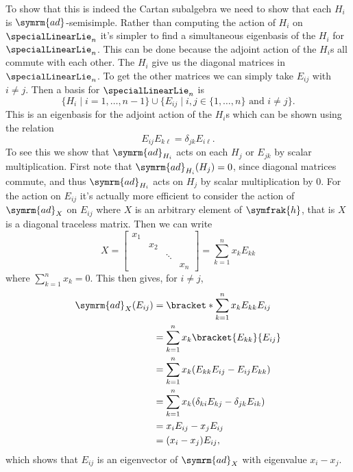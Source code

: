 \documentclass[fleqn]{NotesClass}
\newcommand{\ad}{\symrm{ad}}
\newcommand{\csa}{\symfrak{h}}
\begin{document}
    To show that this is indeed the Cartan subalgebra we need to show that each \(H_i\) is \(\ad\)-semisimple.
    Rather than computing the action of \(H_i\) on \(\specialLinearLie_n\) it's simpler to find a simultaneous eigenbasis of the \(H_i\) for \(\specialLinearLie_n\).
    This can be done because the adjoint action of the \(H_i\)s all commute with each other.
    The \(H_i\) give us the diagonal matrices in \(\specialLinearLie_n\).
    To get the other matrices we can simply take \(E_{ij}\) with \(i \ne j\).
    Then a basis for \(\specialLinearLie_n\) is
    \begin{equation}
        \{H_i \mid i = 1, \dotsc, n - 1\} \cup \{E_{ij} \mid i, j \in \{1, \dotsc, n\} \text{ and } i \ne j\}.
    \end{equation}
    This is an eigenbasis for the adjoint action of the \(H_i\)s which can be shown using the relation
    \begin{equation}
        E_{ij}E_{k\ell} = \delta_{jk}E_{i\ell}.
    \end{equation}
    To see this we show that \(\ad_{H_i}\) acts on each \(H_j\) or \(E_{jk}\) by scalar multiplication.
    First note that \(\ad_{H_i}(H_j) = 0\), since diagonal matrices commute, and thus \(\ad_{H_i}\) acts on \(H_j\) by scalar multiplication by \(0\).
    For the action on \(E_{ij}\) it's actually more efficient to consider the action of \(\ad_{X}\) on \(E_{ij}\) where \(X\) is an arbitrary element of \(\csa\), that is \(X\) is a diagonal traceless matrix.
    Then we can write
    \begin{equation}
        X = 
        \begin{bmatrix}
            x_1 \\
            & x_2\\
            && \ddots\\
            &&& x_n
        \end{bmatrix}
        = \sum_{k=1}^{n} x_k E_{kk}
    \end{equation}
    where \(\sum_{k=1}^n x_k = 0\).
    This then gives, for \(i \ne j\),
    \begin{align}
        \ad_X(E_{ij}) &= \bracket*{\sum_{k=1}^n x_k E_{kk}}{E_{ij}}\\
        &= \sum_{k=1}^n x_k \bracket{E_{kk}}{E_{ij}}\\
        &= \sum_{k=1}^n x_k (E_{kk}E_{ij} - E_{ij}E_{kk})\\
        &= \sum_{k=1}^n x_k (\delta_{ki}E_{kj} - \delta_{jk}E_{ik})\\
        &= x_i E_{ij} - x_j E_{ij}\\
        &= (x_i - x_j) E_{ij},
    \end{align}
    which shows that \(E_{ij}\) is an eigenvector of \(\ad_X\) with eigenvalue \(x_i - x_j\).
    
\end{document}
